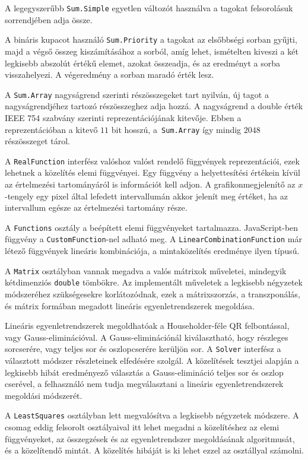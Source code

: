 A legegyszerűbb \texttt{Sum.Simple} egyetlen változót használva a tagokat felsorolásuk sorrendjében adja össze.

A bináris kupacot használó \texttt{Sum.Priority} a tagokat az elsőbbségi sorban gyűjti, majd a végső összeg kiszámításához a sorból, amíg lehet, ismételten kiveszi a két legkisebb abszolút értékű elemet, azokat összeadja, és az eredményt a sorba visszahelyezi.
A végeredmény a sorban maradó érték lesz.

A \texttt{Sum.Array} nagyságrend szerinti részösszegeket tart nyilván, új tagot a nagyságrendjéhez tartozó részösszeghez adja hozzá.
A nagyságrend a double érték IEEE 754 szabvány szerinti reprezentációjának kitevője. Ebben a reprezentációban a kitevő $11$ bit hosszú, a\texttt{ Sum.Array} így mindig $2048$ részösszeget tárol.

A \texttt{RealFunction} interfész valóshoz valóst rendelő függvények reprezentációi, ezek lehetnek a közelítés elemi függvényei.
Egy függvény a helyettesítési értékein kívül az értelmezési tartományáról is információt kell adjon.
A grafikonmegjelenítő az $x$-tengely egy pixel által lefedett intervallumán akkor jelenít meg értéket, ha az intervallum egésze az értelmezési tartomány része.

A \texttt{Functions} osztály a beépített elemi függvényeket tartalmazza.
JavaScript-ben függvény a \texttt{CustomFunction}-nel adható meg.
A \texttt{LinearCombinationFunction} már létező függvények lineáris kombinációja, a mintaközelítés eredménye ilyen típusú.

A \texttt{Matrix} osztályban vannak megadva a valós mátrixok műveletei, mindegyik kétdimenziós \texttt{double} tömbökre.
Az implementált műveletek a legkisebb négyzetek módszeréhez szükségesekre korlátozódnak, ezek a mátrixszorzás, a transzponálás, és mátrix formában megadott lineáris egyenletrendszerek megoldása.

Lineáris egyenletrendszerek megoldhatóak a Householder-féle QR felbontással, vagy Gauss-eliminációval.
A Gauss-eliminációnál kiválasztható, hogy részleges sorcserére, vagy teljes sor és oszlopcserére kerüljön sor.
A \texttt{Solver} interfész a választott módszer részleteinek elfedésére szolgál.
A közelítések tesztjei alapján a legkisebb hibát eredményező választás a Gauss-elimináció teljes sor és oszlop cserével, a felhasználó nem tudja megválasztani a lineáris egyenletrendszerek megoldási módszerét.

A \texttt{LeastSquares} osztályban lett megvalósítva a legkisebb négyzetek módszere.
A csomag eddig felsorolt osztályaival itt lehet megadni a közelítéshez az elemi függvényeket, az összegzések és az egyenletrendszer megoldásának algoritmusát, és a közelítendő mintát.
A közelítés hibáját is ki lehet ezzel az osztállyal számolni.


